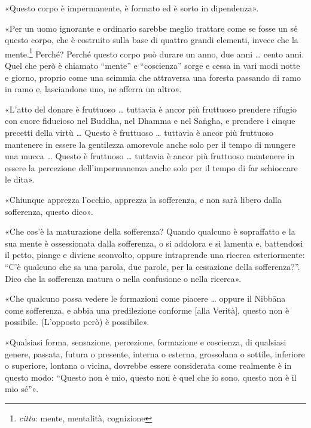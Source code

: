 
«Questo corpo è impermanente, è formato ed è sorto in dipendenza».


«Per un uomo ignorante e ordinario sarebbe meglio trattare come se fosse un sé
questo corpo, che è costruito sulla base di quattro grandi elementi, invece che
la mente.\footnote{\emph{citta}: mente, mentalità, cognizione} Perché? Perché
questo corpo può durare un anno, due anni … cento anni. Quel che però è chiamato
“mente” e “coscienza” sorge e cessa in vari modi notte e giorno, proprio come
una scimmia che attraversa una foresta passando di ramo in ramo e, lasciandone
uno, ne afferra un altro».


«L’atto del donare è fruttuoso … tuttavia è ancor più fruttuoso prendere rifugio
con cuore fiducioso nel Buddha, nel Dhamma e nel Saṅgha, e prendere i cinque
precetti della virtù … Questo è fruttuoso … tuttavia è ancor più fruttuoso
mantenere in essere la gentilezza amorevole anche solo per il tempo di mungere
una mucca … Questo è fruttuoso … tuttavia è ancor più fruttuoso mantenere in
essere la percezione dell’impermanenza anche solo per il tempo di far schioccare
le dita».


«Chiunque apprezza l’occhio, apprezza la sofferenza, e non sarà libero dalla
sofferenza, questo dico».


«Che cos’è la maturazione della sofferenza? Quando qualcuno è sopraffatto e la
sua mente è ossessionata dalla sofferenza, o si addolora e si lamenta e,
battendosi il petto, piange e diviene sconvolto, oppure intraprende una ricerca
esteriormente: “C’è qualcuno che sa una parola, due parole, per la cessazione
della sofferenza?”. Dico che la sofferenza matura o nella confusione o nella
ricerca».


«Che qualcuno possa vedere le formazioni come piacere … oppure il Nibbāna come
sofferenza, e abbia una predilezione conforme [alla Verità], questo non è
possibile. (L’opposto però) è possibile».


«Qualsiasi forma, sensazione, percezione, formazione e coscienza, di qualsiasi
genere, passata, futura o presente, interna o esterna, grossolana o sottile,
inferiore o superiore, lontana o vicina, dovrebbe essere considerata come
realmente è in questo modo: “Questo non è mio, questo non è quel che io sono,
questo non è il mio sé”».

